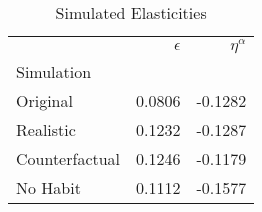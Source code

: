 \begin{table}
\centering
\caption{Simulated Elasticities}
\label{tab:elasts}
\begin{tabular}{lrr}
\toprule
{} & $\epsilon$ & $\eta^{\alpha}$ \\
Simulation     &            &                 \\
\midrule
Original       &     0.0806 &         -0.1282 \\
Realistic      &     0.1232 &         -0.1287 \\
Counterfactual &     0.1246 &         -0.1179 \\
No Habit       &     0.1112 &         -0.1577 \\
\bottomrule
\end{tabular}
\end{table}
